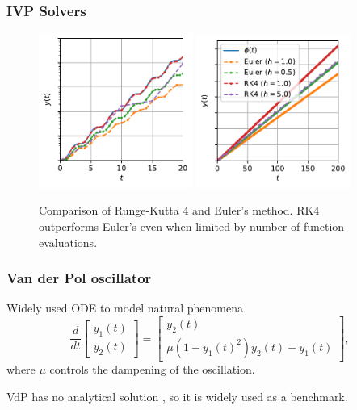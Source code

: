 \documentclass[t]{beamer}
\begin{document}
\begin{frame}
    \frametitle{IVP Solvers}
    \begin{figure}[h]
	\centering
	\includegraphics[width=0.45\textwidth]{../images/ode_solver_comparison_zoom.pdf}
	\includegraphics[width=0.45\textwidth]{../images/ode_solver_comparison.pdf}
	\caption{Comparison of Runge-Kutta 4 and Euler's method. RK4 outperforms Euler's even when limited by number of function evaluations.}
	\label{fig:ode_comparison}
    \end{figure}
\end{frame}

\begin{frame}
    \frametitle{Van der Pol oscillator}
    Widely used ODE to model natural phenomena \[
    \frac{d}{dt}\begin{bmatrix} y_1\left( t \right) \\ y_2\left( t \right)  \end{bmatrix} = \begin{bmatrix} 
y_2\left( t \right) \\
\mu\left( 1-y_1\left( t \right) ^2 \right) y_2\left( t \right) - y_1(t)
\end{bmatrix} 
    ,\] where $\mu$ controls the dampening of the oscillation.

    VdP has no analytical solution \cite{panayotounakos_lack_2003}, so it is widely used as a benchmark.
\end{frame}
\end{document}

